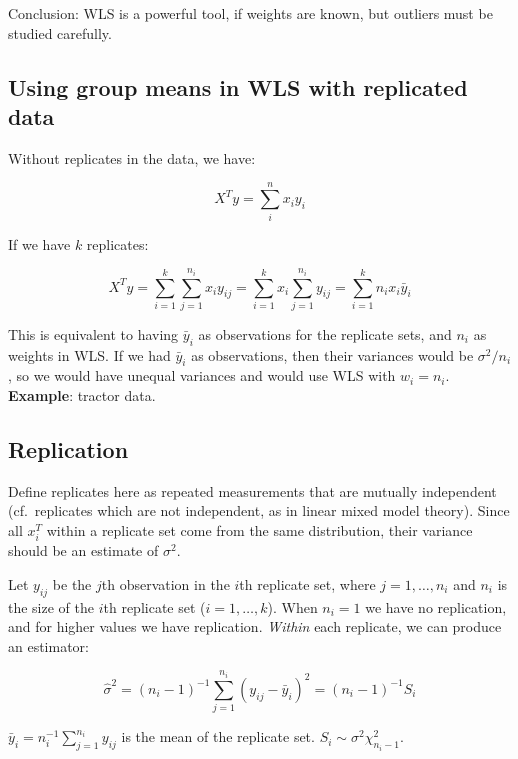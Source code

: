 Conclusion: WLS is a powerful tool, if weights are known, but outliers must be studied carefully.

\subsection{Using group means in WLS with replicated data}

Without replicates in the data, we have:

\begin{equation}
X^T y = \sum_i^n x_i y_i
\end{equation}

If we have $k$ replicates:

\begin{equation}
X^T y = \sum_{i=1}^k \sum_{j=1}^{n_i} x_i y_{ij} =  
\sum_{i=1}^k x_i  \sum_{j=1}^{n_i}  y_{ij} 
= \sum_{i=1}^k n_i x_i \bar{y}_i
\end{equation}

This is equivalent to having $\bar{y}_i$ as observations for the replicate sets, and $n_i$ as weights in WLS.
If we had $\bar{y}_i$ as observations, then their variances would be $\sigma^2/n_i$, so we would have unequal variances and would use WLS with $w_i = n_i$. \textbf{Example}: tractor data.

\subsection{Replication}

Define replicates here as repeated measurements that are mutually independent (cf.\ replicates which are not independent, as in linear mixed model theory).
Since all $x_i^T$ within a replicate set come from the same distribution, their variance should be an estimate of $\sigma^2$.

Let $y_{ij}$ be the $j$th observation in the $i$th replicate set, where $j=1,\dots,n_i$ and $n_i$ is the size of the $i$th replicate set ($i=1,\dots,k$). When $n_i = 1$ we have no replication, and for higher values we have replication. \textit{Within} each replicate, we can produce an estimator:

\begin{equation}
\hat{\sigma}^2 =  (n_i - 1)^{-1}  \sum_{j=1}^{n_{i}} (y_{ij} - \bar{y}_i)^2 = (n_i - 1)^{-1}S_i
\end{equation}

$\bar{y}_i=n_i^{-1} \sum_{j=1}^{n_i} y_{ij}$  is the mean of the replicate set.
$S_i \sim \sigma^2 \chi_{n_i - 1}^2$.

